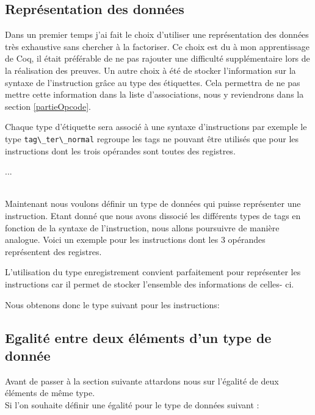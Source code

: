 \documentclass {article}
\newcommand{\codefrom}[3]
           {}
\theoremstyle{definition}
\theoremstyle{remark}
\newcommand{\fun}[1]{\lstinline!#1!}
\begin{document}
\subsection{Représentation des données}
\label{representation des donnees}

Dans un premier temps j'ai fait le choix d'utiliser une représentation des données très exhaustive sans
chercher à la factoriser. Ce choix est du à mon apprentissage de Coq, il était préférable de ne pas
rajouter une difficulté supplémentaire lors de la réalisation des preuves.
Un autre choix à été de stocker l'information sur la syntaxe de l'instruction grâce au type des étiquettes.
Cela permettra de ne pas mettre cette information dans la liste d'associations, nous y reviendrons dans la
section \ref{partieOpcode}.

\codefrom{src}{ast_instructions}{tag}

Chaque type d'étiquette sera associé à une syntaxe d'instructions par exemple le type \fun{tag\_ter\_normal}
regroupe les tags ne pouvant être utilisés que pour les instructions dont les trois
opérandes sont toutes des registres.

\codefrom{src}{ast_instructions}{tag_definition}
...

\\ 

Maintenant nous voulons définir un type de données qui puisse représenter une instruction.
Etant donné que nous avons dissocié les différents types de tags en fonction de la syntaxe de l'instruction,
nous allons poursuivre de manière analogue.
Voici un exemple pour les instructions dont les 3 opérandes représentent des registres.

\codefrom{src}{ast_instructions}{instruction_tern_n}

L'utilisation du type enregistrement convient parfaitement pour représenter les instructions car il permet de stocker
l'ensemble des informations de celles- ci.

Nous obtenons donc le type suivant pour les instructions:
\codefrom{src}{ast_instructions}{instruction}




\subsection{Egalité entre deux éléments d'un type de donnée}
Avant de passer à la section suivante attardons nous sur l'égalité de deux éléments de même type.
\\
Si l'on souhaite définir une égalité pour le type de données suivant :
\codefrom{rapport}{definitions}{example_type}
\end{document}
